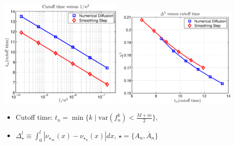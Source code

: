 \documentclass[12pt,t]{beamer}
\begin{document}
\begin{frame}
\begin{center}
\includegraphics[width=0.45\textwidth,trim=1cm 1cm 0cm 0cm]{cutofftimevsD}
\includegraphics[width=0.45\textwidth,trim=1cm 1cm 0cm 0cm]{areavscutofftime}
\end{center}
\begin{itemize}
\item Cutoff time: $t_n =\min \{ k \mid \text{var}(f^k_n)< \frac{M+m}{2}\} $,
\item $\Delta_{\star}^l\equiv \int_0^l | \nu_{{\star}_\infty}(x)-\nu_{{\star}_n}(x)|dx$, $\star=\{A_n,\bar{A}_n\}$
\end{itemize}

\end{frame}
\end{document}
